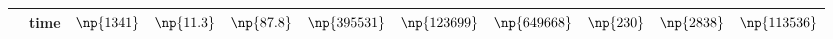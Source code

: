 \begin{center}
\begin{tabular}{lrcccc|ccccc}
                                                  & time   &      $\np{1341}$ &      $\np{11.3}$ &      $\np{87.8}$ &    $\np{395531}$ &    $\np{123699}$ &    $\np{649668}$ &                    $\np{230}$ &                   $\np{2838}$ &                 $\np{113536}$ \\
\bottomrule
\end{tabular}
\end{center}
